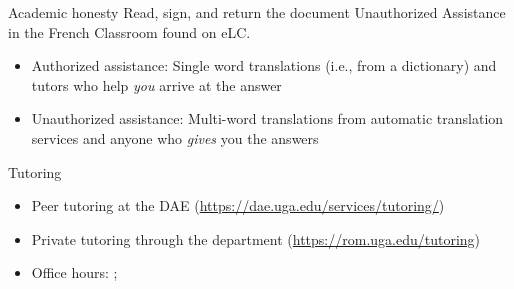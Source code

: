 \begin{frame}{Academic honesty}
  Read, sign, and return the document Unauthorized Assistance in the French Classroom found on eLC.
  \begin{itemize}
    \item Authorized assistance: \alert{Single word} translations (i.e., from a dictionary) and tutors who help \emph{you} arrive at the answer
    \item Unauthorized assistance: \alert{Multi-word} translations from automatic translation services and anyone who \emph{gives} you the answers
  \end{itemize}
\end{frame}

\begin{frame}{Tutoring}
  \begin{itemize}
    \item Peer tutoring at the DAE (\url{https://dae.uga.edu/services/tutoring/})
    \item Private tutoring through the department (\url{https://rom.uga.edu/tutoring})
    \item Office hours: ; 
  \end{itemize}
\end{frame}